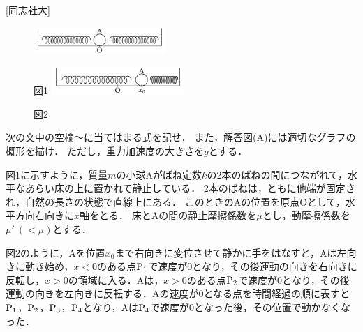 

\noindent
{} [同志社大]

\begin{figure}
  \centering
  \includegraphics[width=5cm]{fig/fig_1_11_1.pdf}
  
  図1
  \includegraphics[width=5cm]{fig/fig_1_11_2.pdf}

  図2
\end{figure}


次の文中の空欄〜に当てはまる式を記せ．
また，解答図(A)には適切なグラフの概形を描け．
ただし，重力加速度の大きさを$g$とする．

図1に示すように，質量$m$の小球Aがばね定数$k$の2本のばねの間につながれて，水平なあらい床の上に置かれて静止している．
2本のばねは，ともに他端が固定され，自然の長さの状態で直線上にある．
このときのAの位置を原点Oとして，水平方向右向きに$x$軸をとる．
床とAの間の静止摩擦係数を$\mu$とし，動摩擦係数を$\mu' \ (< \mu)$とする．

図2のように，Aを位置$x_0$まで右向きに変位させて静かに手をはなすと，Aは左向きに動き始め，$x < 0$のある点$\mathrm{P}_1$で速度が0となり，その後運動の向きを右向きに反転し，$x > 0$の領域に入る．Aは，$x > 0$のある点$\mathrm{P}_2$で速度が0となり，その後運動の向きを左向きに反転する．Aの速度が0となる点を時間経過の順に表すと$\mathrm{P}_1$，$\mathrm{P}_2$，$\mathrm{P}_3$，$\mathrm{P}_4$となり，Aは$\mathrm{P}_4$で速度が0となった後，その位置で動かなくなった．


